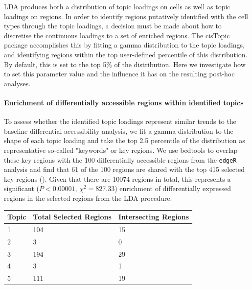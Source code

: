 LDA produces both a distribution of topic loadings on cells as well as topic loadings on regions. In order to identify regions putatively identified with the cell types through the topic loadings, a decision must be made about how to discretise the continuous loadings to a set of enriched regions. The cisTopic package accomplishes this by fitting a gamma distribution to the topic loadings, and identifying regions within the top user-defined percentile of this distribution. By default, this is set to the top 5\% of the distribution. Here we investigate how to set this parameter value and the influence it has on the resulting post-hoc analyses. 

\paragraph{Enrichment of differentially accessible regions within identified topics}

To assess whether the identified topic loadings represent similar trends to the baseline differential accessibility analysis, we fit a gamma distribution to the shape of each topic loading and take the top 2.5 percentile of the distribution as representative so-called "keywords" or key regions. We use bedtools to overlap these key regions with the 100 differentially accessible regions from the {\tt edgeR} analysis and find that 61 of the 100 regions are shared with the top 415 selected key regions (). Given that there are 10074 regions in total, this represents a significant ($P<0.00001$, $\chi^2 = 827.33$) enrichment of differentially expressed regions in the selected regions from the LDA procedure.


\begin{table}
  \centering
  \begin{tabular}{l|l|l}
  Topic & Total Selected Regions & Intersecting Regions  \\ 
  \hline
  1     & 104                    & 15                    \\
  2     & 3                      & 0                     \\
  3     & 194                    & 29                    \\
  4     & 3                      & 1                     \\
  5     & 111                    & 19                   
  \end{tabular}
  \label{table:sc_t5_over}
  \end{table}


